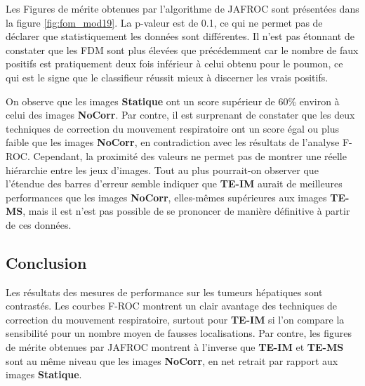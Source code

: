 Les Figures de mérite obtenues par l'algorithme de JAFROC sont présentées dans la figure \ref{fig:fom_mod19}. La p-valeur est de 0.1, ce qui ne permet pas de déclarer que statistiquement les données sont différentes.
Il n'est pas étonnant de constater que les FDM sont plus élevées que précédemment car le nombre de faux positifs est pratiquement deux fois inférieur à celui obtenu pour le poumon, ce qui est le signe que le classifieur réussit mieux à discerner les vrais positifs.

On observe que les images \textbf{Statique} ont un score supérieur de 60\% environ à celui des images \textbf{NoCorr}. Par contre, il est surprenant de constater que les deux techniques de correction du mouvement respiratoire ont un score égal ou plus faible que les images \textbf{NoCorr}, en contradiction avec les résultats de l'analyse F-ROC. Cependant, la proximité des valeurs ne permet pas de montrer une réelle hiérarchie entre les jeux d'images. Tout au plus pourrait-on observer que l'étendue des barres d'erreur semble indiquer que \textbf{TE-IM} aurait de meilleures performances que les images \textbf{NoCorr}, elles-mêmes supérieures aux images \textbf{TE-MS}, mais il est n'est pas possible de se prononcer de manière définitive à partir de ces données. 




\subsection{Conclusion}

Les résultats des mesures de performance sur les tumeurs hépatiques sont contrastés. Les courbes F-ROC montrent un clair avantage des techniques de correction du mouvement respiratoire, surtout pour \textbf{TE-IM} si l'on compare la sensibilité pour un nombre moyen de fausses localisations. Par contre, les figures de mérite obtenues par JAFROC montrent à l'inverse que \textbf{TE-IM} et \textbf{TE-MS} sont au même niveau que les images \textbf{NoCorr}, en net retrait par rapport aux images \textbf{Statique}.





